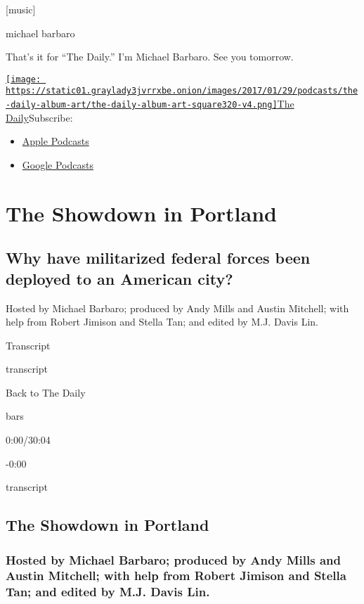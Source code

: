 {[}music{]}

michael barbaro

That's it for ``The Daily.'' I'm Michael Barbaro. See you tomorrow.

\href{https://www.nytimes3xbfgragh.onion/column/the-daily}{\texttt{[image: https://static01.graylady3jvrrxbe.onion/images/2017/01/29/podcasts/the-daily-album-art/the-daily-album-art-square320-v4.png]}The
Daily}Subscribe:

\begin{itemize}
\tightlist
\item
  \href{https://itunes.apple.com/us/podcast/id1200361736}{Apple
  Podcasts}
\item
  \href{https://www.google.com/podcasts?feed=aHR0cHM6Ly9yc3MuYXJ0MTkuY29tL3RoZS1kYWlseQ\%3D\%3D}{Google
  Podcasts}
\end{itemize}

\hypertarget{the-showdown-in-portland-1}{%
\section{The Showdown in Portland}\label{the-showdown-in-portland-1}}

\hypertarget{why-have-militarized-federal-forces-been-deployed-to-an-american-city-1}{%
\subsection{Why have militarized federal forces been deployed to an
American
city?}\label{why-have-militarized-federal-forces-been-deployed-to-an-american-city-1}}

Hosted by Michael Barbaro; produced by Andy Mills and Austin Mitchell;
with help from Robert Jimison and Stella Tan; and edited by M.J. Davis
Lin.

Transcript

transcript

Back to The Daily

bars

0:00/30:04

-0:00

transcript

\hypertarget{the-showdown-in-portland-2}{%
\subsection{The Showdown in Portland}\label{the-showdown-in-portland-2}}

\hypertarget{hosted-by-michael-barbaro-produced-by-andy-mills-and-austin-mitchell-with-help-from-robert-jimison-and-stella-tan-and-edited-by-mj-davis-lin-1}{%
\subsubsection{Hosted by Michael Barbaro; produced by Andy Mills and
Austin Mitchell; with help from Robert Jimison and Stella Tan; and
edited by M.J. Davis
Lin.}\label{hosted-by-michael-barbaro-produced-by-andy-mills-and-austin-mitchell-with-help-from-robert-jimison-and-stella-tan-and-edited-by-mj-davis-lin-1}}

